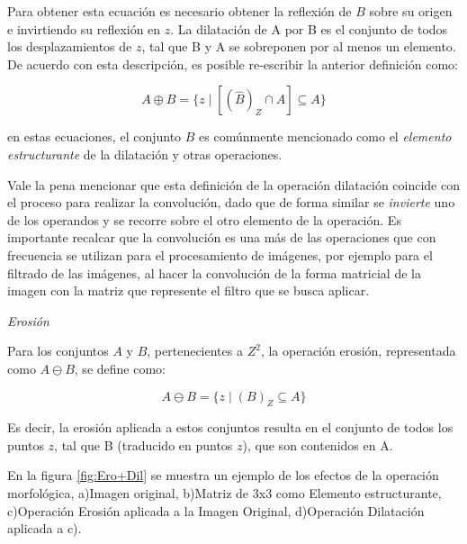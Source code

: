 Para obtener esta ecuación es necesario obtener la reflexión de $B$ sobre su origen e invirtiendo su reflexión en $z$. La dilatación de A por B es el conjunto de todos los desplazamientos de $z$, tal que B y A se sobreponen por al menos un elemento. De acuerdo con esta descripción, es posible re-escribir la anterior definición como:

\begin{equation*}
A \oplus B = \{ z \mid [(\hat{B})_{Z} \cap A] \subseteq A \}
\end{equation*}

en estas ecuaciones, el conjunto $B$ es comúnmente mencionado como el \textit{elemento estructurante} de la dilatación y otras operaciones.

Vale la pena mencionar que esta definición de la operación dilatación coincide con el proceso para realizar la convolución, dado que de forma similar se \textit{invierte} uno de los operandos y se recorre sobre el otro elemento de la operación. Es importante recalcar que la convolución es una más de las operaciones que con frecuencia se utilizan para el procesamiento de imágenes, por ejemplo para el filtrado de las imágenes, al hacer la convolución de la forma matricial de la imagen con la matriz que represente el filtro que se busca aplicar. 

\emph{Erosión}


Para los conjuntos $A$ y $B$, pertenecientes a $Z^{2}$, la operación erosión, representada como $A \ominus B$, se define como:

\begin{equation*}
A \ominus B = \{ z \mid (B)_{Z} \subseteq A \}
\end{equation*}

Es decir, la erosión aplicada a estos conjuntos resulta en el conjunto de todos los puntos $z$, tal que B (traducido en puntos $z$), que son contenidos en A.

En la figura \ref{fig:Ero+Dil} se muestra un ejemplo de los efectos de la operación morfológica, a)Imagen original, b)Matriz de 3x3 como Elemento estructurante, c)Operación Erosión aplicada a la Imagen Original, d)Operación Dilatación aplicada a c).

